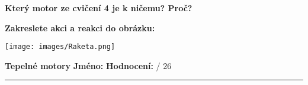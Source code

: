\documentclass[../main.tex]{subfiles}
\begin{document}
\begin{enumerate}[label={\textbf{\arabic*.}}]
\begin{minipage}[t]{0.4\textwidth}
        \tecky{8cm}
        \tecky{8cm}
        \item \textbf{Který motor ze cvičení 4 je k ničemu? Proč?}\\
        \tecky{8cm}
        \tecky{8cm}
        \item \textbf{Zakreslete akci a reakci do obrázku:}
        \begin{center}
            \texttt{[image: images/Raketa.png]}
        \end{center}
    \end{minipage}
    \newpage\pagestyle{empty}
\end{enumerate}
    {\Large\textbf{Tepelné motory}}
    \hfill
    \textbf{Jméno:}
    \tecky{3cm}
    \hspace{0.25cm}
    \textbf{Hodnocení:}
    \tecky{0.5cm}
    {/}
    {26}
    \vspace{0.25cm}
    \hrule
\end{document}
